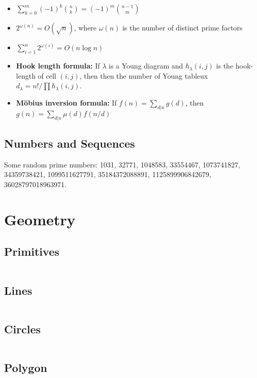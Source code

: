 \documentclass[9pt,a4paper,twocolumn,landscape,oneside]{amsart}
\newcommand{\code}[1]{\inputminted{cpp}{_code/#1}}
\newif\ifverbose
\begin{document}
\begin{itemize}[leftmargin=*]
            \item $\sum_{k=0}^m (-1)^k \binom{n}{k} = (-1)^m \binom{n-1}{m}$
            \item $2^{\omega(n)} = O(\sqrt{n})$, where $\omega(n)$ is the number of distinct prime factors
            \item $\sum_{i=1}^n 2^{\omega(i)} = O(n \log n)$
            \item \textbf{Hook length formula:} If $\lambda$ is a Young diagram and $h_{\lambda}(i,j)$ is the hook-length of cell $(i,j)$, then then the number of Young tableux $d_{\lambda} = n!/\prod h_{\lambda}(i,j)$.
            \item \textbf{Möbius inversion formula:} If $f(n) = \sum_{d|n} g(d)$, then $g(n) = \sum_{d|n} \mu(d) f(n/d)$
        \end{itemize}


    \subsection{Numbers and Sequences}
        Some random prime numbers: 1031, 32771, 1048583, 33554467,
        1073741827, 34359738421, 1099511627791, 35184372088891,
        1125899906842679, 36028797018963971.

\section{Geometry}
    \subsection{Primitives}
        \ifverbose
        Geometry primitives.
        \fi
        \code{geometry/primitives.cpp}
    \subsection{Lines}
        \ifverbose
        Line related functions.
        \fi
        \code{geometry/lines.cpp}
    \subsection{Circles}
        \ifverbose
        Circle related functions.
        \fi
        \code{geometry/circles.cpp}

    \subsection{Polygon}
        \ifverbose
        Polygon primitives.
        \fi
        \code{geometry/polygon.cpp}
\end{document}
